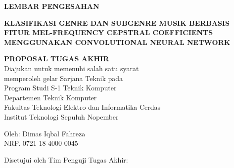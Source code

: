 \begin{center}
	\large
  \textbf{LEMBAR PENGESAHAN}
\end{center}

\thispagestyle{empty}

\begin{center}
  \textbf{KLASIFIKASI GENRE DAN SUBGENRE MUSIK BERBASIS FITUR MEL-FREQUENCY CEPSTRAL COEFFICIENTS MENGGUNAKAN CONVOLUTIONAL NEURAL NETWORK}
\end{center}

\begingroup
  \small
  
  \vspace{3ex}

  \begin{center}
    \textbf{PROPOSAL TUGAS AKHIR}
    \\Diajukan untuk memenuhi salah satu syarat
    \\memperoleh gelar Sarjana Teknik pada
    \\Program Studi S-1 Teknik Komputer
    \\Departemen Teknik Komputer
    \\Fakultas Teknologi Elektro dan Informatika Cerdas
    \\Institut Teknologi Sepuluh Nopember
  \end{center}

  \vspace{3ex}

  \begin{center}
    Oleh: Dimas Iqbal Fahreza
    \\NRP. 0721 18 4000 0045
  \end{center}

  \vspace{3ex}


  \begin{center}
    Disetujui oleh Tim Penguji Tugas Akhir:
  \end{center}

  \vspace{4ex}

